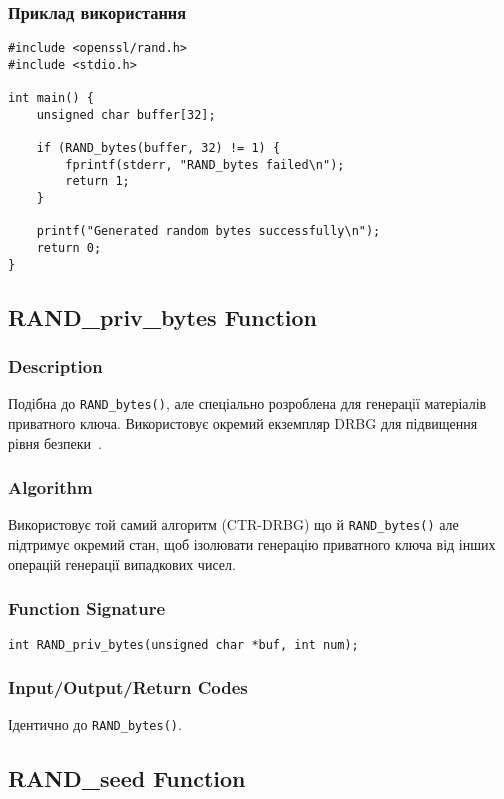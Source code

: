 \subsubsection{Приклад використання}
\begin{verbatim}
#include <openssl/rand.h>
#include <stdio.h>

int main() {
    unsigned char buffer[32];
    
    if (RAND_bytes(buffer, 32) != 1) {
        fprintf(stderr, "RAND_bytes failed\n");
        return 1;
    }
    
    printf("Generated random bytes successfully\n");
    return 0;
}
\end{verbatim}

\subsection{RAND\_priv\_bytes Function}

\subsubsection{Description}
Подібна до \texttt{RAND\_bytes()}, але спеціально розроблена для генерації матеріалів приватного ключа. Використовує 
окремий екземпляр DRBG для підвищення рівня безпеки~\cite{openssl_manual}.

\subsubsection{Algorithm}
Використовує той самий алгоритм (CTR-DRBG) що й \texttt{RAND\_bytes()} але підтримує окремий стан, щоб ізолювати генерацію
приватного ключа від інших операцій генерації випадкових чисел.

\subsubsection{Function Signature}
\begin{verbatim}
int RAND_priv_bytes(unsigned char *buf, int num);
\end{verbatim}

\subsubsection{Input/Output/Return Codes}
Ідентично до \texttt{RAND\_bytes()}.

\subsection{RAND\_seed Function}

